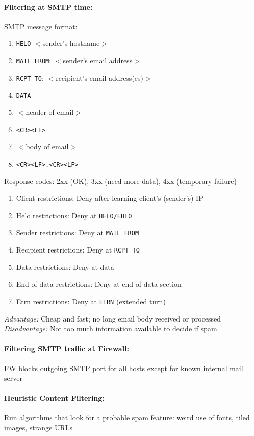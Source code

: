 \paragraph{Filtering at SMTP time:} SMTP message format:
\begin{enumerate}
\item {\tt HELO} $<$sender's hostname$>$
\item {\tt MAIL FROM}: $<$sender's email address$>$
\item {\tt RCPT TO}: $<$recipient's email address(es)$>$
\item {\tt DATA}
\item $<$header of email$>$
\item {\tt <CR><LF>}
\item $<$body of email$>$
\item {\tt <CR><LF>.<CR><LF>}
\end{enumerate}

Response codes: 2xx (OK), 3xx (need more data), 4xx (temporary failure)
\begin{enumerate}
\item Client restrictions: Deny after learning client's (sender's) IP 
\item Helo restrictions: Deny at {\tt HELO/EHLO}
\item Sender restrictions: Deny at {\tt MAIL FROM}
\item Recipient restrictions: Deny at {\tt RCPT TO}
\item Data restrictions: Deny at data
\item End of data restrictions: Deny at end of data section
\item Etrn restrictions: Deny at {\tt ETRN} (extended turn)
\end{enumerate}

\textit{Advantage:} Cheap and fast; no long email body received or processed \\
\textit{Disadvantage:} Not too much information available to decide if spam

\paragraph{Filtering SMTP traffic at Firewall:} FW blocks outgoing SMTP port for all hosts except for known internal mail server

\paragraph{Heuristic Content Filtering:} Run algorithms that look for a probable spam feature: weird use of fonts, tiled images, strange URLs 

